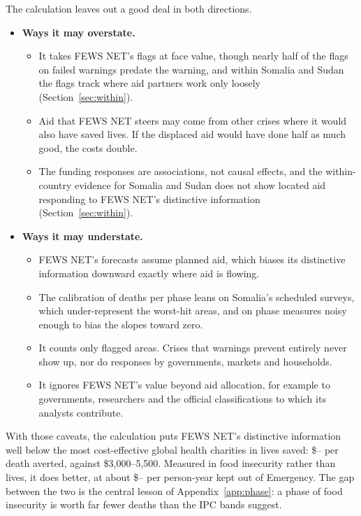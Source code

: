 \documentclass[11pt]{article}
\begin{document}
\begin{appendices}
The calculation leaves out a good deal in both directions.
\begin{itemize}
  \item \textbf{Ways it may overstate.}
    \begin{itemize}
      \item It takes FEWS NET's flags at face value, though nearly half of the flags on failed warnings predate the warning, and within Somalia and Sudan the flags track where aid partners work only loosely (Section~\ref{sec:within}).
      \item Aid that FEWS NET steers may come from other crises where it would also have saved lives. If the displaced aid would have done half as much good, the costs double.
      \item The funding responses are associations, not causal effects, and the within-country evidence for Somalia and Sudan does not show located aid responding to FEWS NET's distinctive information (Section~\ref{sec:within}).
    \end{itemize}
  \item \textbf{Ways it may understate.}
    \begin{itemize}
      \item FEWS NET's forecasts assume planned aid, which biases its distinctive information downward exactly where aid is flowing.
      \item The calibration of deaths per phase leans on Somalia's scheduled surveys, which under-represent the worst-hit areas, and on phase measures noisy enough to bias the slopes toward zero.
      \item It counts only flagged areas. Crises that warnings prevent entirely never show up, nor do responses by governments, markets and households.
      \item It ignores FEWS NET's value beyond aid allocation, for example to governments, researchers and the official classifications to which its analysts contribute.
    \end{itemize}
\end{itemize}
With those caveats, the calculation puts FEWS NET's distinctive information well below the most cost-effective global health charities in lives saved: \$\bcDistinctLo{}--\bcDistinctHi{} per death averted, against \$3,000--5,500. Measured in food insecurity rather than lives, it does better, at about \$\dCostEmergLo{}--\dCostEmergHi{} per person-year kept out of Emergency. The gap between the two is the central lesson of Appendix~\ref{app:phase}: a phase of food insecurity is worth far fewer deaths than the IPC bands suggest.


\end{appendices}
\end{document}
